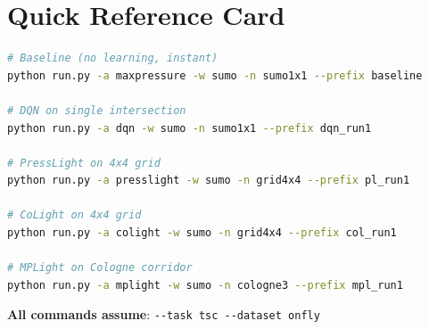 \documentclass[11pt,a4paper]{article}
\begin{document}
\section{Quick Reference Card}

\begin{tcolorbox}[colback=gray!5!white, colframe=gray!75!black, title=\textbf{Cheat Sheet}]
\begin{lstlisting}[language=bash]
# Baseline (no learning, instant)
python run.py -a maxpressure -w sumo -n sumo1x1 --prefix baseline

# DQN on single intersection
python run.py -a dqn -w sumo -n sumo1x1 --prefix dqn_run1

# PressLight on 4x4 grid
python run.py -a presslight -w sumo -n grid4x4 --prefix pl_run1

# CoLight on 4x4 grid
python run.py -a colight -w sumo -n grid4x4 --prefix col_run1

# MPLight on Cologne corridor
python run.py -a mplight -w sumo -n cologne3 --prefix mpl_run1
\end{lstlisting}
\textbf{All commands assume}: \texttt{-{}-task tsc -{}-dataset onfly}
\end{tcolorbox}
\end{document}
